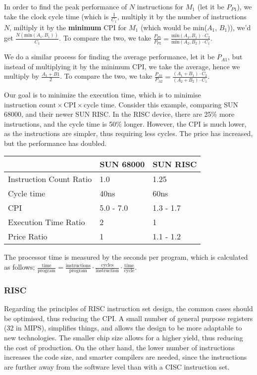 \documentclass[a4paper, 12pt]{article}
\begin{document}
                In order to find the peak performance of $N$ instructions for $M_1$ (let it be $P_{P1}$), we take the clock cycle time (which is $\frac{1}{C_1}$, multiply it by the number of instructions $N$, miltiply it by the \textbf{minimum} CPI for $M_1$ (which would be min($A_1$, $B_1$)), we'd get $\frac{N(\text{min}(A_1, B_1))}{C_1}$. To compare the two, we take $\frac{P_{P1}}{P_{P2}} = \frac{\text{min}(A_1, B_1) \cdot C_2}{\text{min}(A_2, B_2) \cdot C_1}$.
                \medskip

                We do a similar process for finding the average performance, let it be $P_{A1}$, but instead of multiplying it by the minimum CPI, we take the average, hence we multiply by $\frac{A_1 + B1}{2}$. To compare the two, we take $\frac{P_{A1}}{P_{A2}} = \frac{(A_1 + B_1) \cdot C_2}{(A_2 + B_2) \cdot C_1}$.
                \medskip

                Our goal is to minimize the execution time, which is to minimise $\text{instruction count} \times \text{CPI} \times \text{cycle time}$. Consider this example, comparing SUN 68000, and their newer SUN RISC. In the RISC device, there are 25\% more instructions, and the cycle time is 50\% longer. However, the CPI is much lower, as the instructions are simpler, thus requiring less cycles. The price has increased, but the performance has doubled.
                \begin{center}
                    \begin{tabular}{l|l|l}
                        & SUN 68000 & SUN RISC \\
                        \hline
                        Instruction Count Ratio & 1.0 & 1.25 \\
                        Cycle time & 40ns & 60ns \\
                        CPI & 5.0 - 7.0 & 1.3 - 1.7 \\
                        Execution Time Ratio & 2 & 1 \\
                        Price Ratio & 1 & 1.1 - 1.2
                    \end{tabular}
                \end{center}
                The processor time is measured by the seconds per program, which is calculated as follows; $\frac{\text{time}}{\text{program}} = \frac{\text{instructions}}{\text{program}} \cdot \frac{\text{cycles}}{\text{instruction}} \cdot \frac{\text{time}}{\text{cycle}}$.
            \subsubsection*{RISC}
                Regarding the principles of RISC instruction set design, the common cases should be optimised, thus reducing the CPI. A small number of general purpose registers (32 in MIPS), simplifies things, and allows the design to be more adaptable to new technologies. The smaller chip size allows for a higher yield, thus reducing the cost of production. On the other hand, the lower number of instructions increases the code size, and smarter compilers are needed, since the instructions are further away from the software level than with a CISC instruction set.
\end{document}
